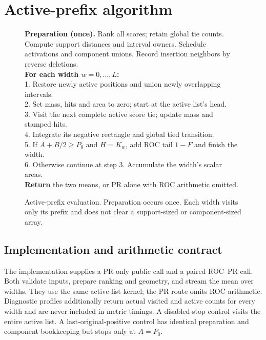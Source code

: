 \section{Active-prefix algorithm}
\begin{figure}[t]
\begin{minipage}{\linewidth}
\textbf{Preparation (once).} Rank all scores; retain global tie counts.
Compute support distances and interval owners. Schedule activations and
component unions. Record insertion neighbors by reverse deletions.\\[3pt]
\textbf{For each width $w=0,\ldots,L$:}\\
1. Restore newly active positions and union newly overlapping intervals.\\
2. Set mass, hits and area to zero; start at the active list's head.\\
3. Visit the next complete active score tie; update mass and stamped hits.\\
4. Integrate its negative rectangle and global tied transition.\\
5. If $A+B/2\ge P_0$ and $H=K_w$, add ROC tail $1-F$ and finish the width.\\
6. Otherwise continue at step 3. Accumulate the width's scalar areas.\\[3pt]
\textbf{Return} the two means, or PR alone with ROC arithmetic omitted.
\end{minipage}
\caption{Active-prefix evaluation. Preparation occurs once. Each width visits
only its prefix and does not clear a support-sized or component-sized array.}
\label{fig:active-algorithm}
\end{figure}



\subsection{Implementation and arithmetic contract}
The implementation supplies a PR-only public call and a paired ROC--PR call.
Both validate inputs, prepare ranking and geometry, and stream the mean over
widths. They use the same active-list kernel; the PR route omits ROC arithmetic.
Diagnostic profiles additionally return actual visited and active counts for
every width and are never included in metric timings. A disabled-stop control
visits the entire active list. A last-original-positive control has identical
preparation and component bookkeeping but stops only at $A=P_0$.

